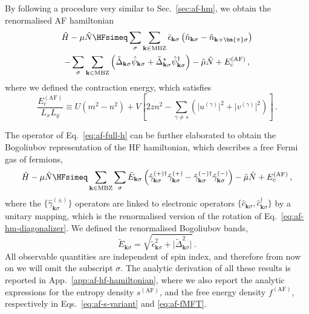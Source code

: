 By following a procedure very similar to Sec.~\ref{sec:af-hm}, we obtain the renormalised AF hamiltonian
\begin{multline}
	\hat H - \mu \hat N \HFsimeq \sum_\sigma \sum_{\mathbf{k}\in\mathrm{MBZ}} \tilde{\epsilon}_{\mathbf{k}\sigma} \left(
	\hat n_{\mathbf{k}\sigma} - \hat n_{\mathbf{k}+\bm{\pi}\sigma}
	\right) \\
	- \sum_\sigma \sum_{\mathbf{k}\in\mathrm{MBZ}} \left(
	\tilde{\Delta}_{\mathbf{k}\sigma}
	\hat \psi_{\mathbf{k}\sigma} + \tilde{\Delta}_{\mathbf{k}\sigma}^* \hat \psi_{\mathbf{k}\sigma}^\dagger
	\right)
	- \tilde{\mu} \hat N + E_\mathrm{c}^{(\mathrm{AF})} \, , \label{eq:af-full-h}
\end{multline}
where we defined the contraction energy, which satisfies
\begin{equation}\label{eq:af-Ec}
	\frac{E_\mathrm{c}^{(\mathrm{AF})}}{L_x L_y} \equiv U(m^2 - n^2) + V \left[
	2zn^2 - \sum_{\gamma \neq s} \left(
	\big|u^{(\gamma)}\big|^2 + \big|v^{(\gamma)}\big|^2
	\right)
	\right] \, .
\end{equation}

The operator of Eq.~\eqref{eq:af-full-h} can be further elaborated to obtain the Bogoliubov representation of the HF hamiltonian, which describes a free Fermi gas of fermions,
\begin{equation}\label{eq:af-ehm-bog}
	\hat H - \mu \hat N \HFsimeq \sum_{\mathbf{k} \in \mathrm{MBZ}} \sum_\sigma \tilde{E}_{\mathbf{k}\sigma} \left(
	\hat \gamma_{\mathbf{k}\sigma}^{(+)\dagger} \hat \gamma_{\mathbf{k}\sigma}^{(+)} - \hat \gamma_{\mathbf{k}\sigma}^{(-)\dagger} \hat \gamma_{\mathbf{k}\sigma}^{(-)}
	\right) - \tilde{\mu} \hat N + E_\mathrm{c}^{(\mathrm{AF})} \, ,
\end{equation}
where the $\lbrace \hat \gamma_{\mathbf{k}\sigma}^{(\pm)} \rbrace$ operators are linked to electronic operators $\lbrace \hat c_{\mathbf{k}\sigma}, \hat c_{\mathbf{k}\sigma}^\dagger \rbrace$ by a unitary mapping, which is the renormalised version of the rotation of Eq.~\eqref{eq:af-hm-diagonalizer}. We defined the renormalised Bogoliubov bands,
\begin{equation}\label{eq:af-bands-2}
	\tilde{E}_{\mathbf{k}\sigma} = \sqrt{
		\tilde{\epsilon}_{\mathbf{k}\sigma}^2 + \big| \tilde{\Delta}_{\mathbf{k}\sigma}^2 \big|
	} \, .
\end{equation}
All observable quantities are independent of spin index, and therefore from now on we will omit the subscript $\sigma$. The analytic derivation of all these results is reported in App.~\ref{app:af-hf-hamiltonian}, where we also report the analytic expressions for the entropy density $s^{(\mathrm{AF})}$, and the free energy density $f^{(\mathrm{AF})}$, respectively in Eqs.~\eqref{eq:af-s-variant} and \eqref{eq:af-fMFT}.

